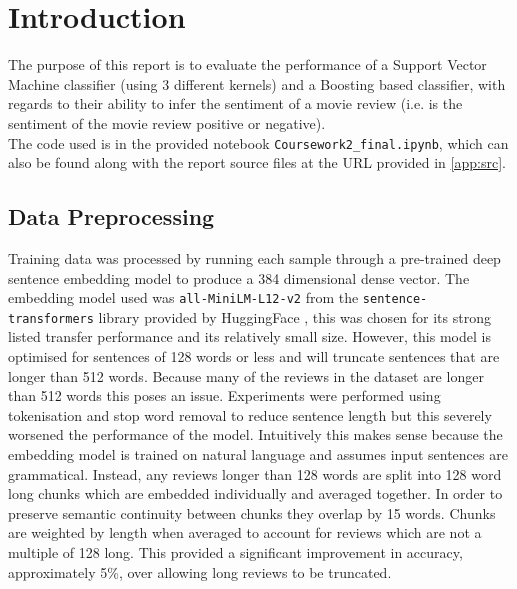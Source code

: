 \section{Introduction}

The purpose of this report is to evaluate the performance of a Support Vector Machine classifier (using 3 different kernels) and a Boosting based classifier, with regards to their ability to infer the sentiment of a movie review (i.e. is the sentiment of the movie review positive or negative).\\
The code used is in the provided notebook \verb|Coursework2_final.ipynb|, which can also be found along with the report source files at the URL provided in \autoref{app:src}.


\subsection{Data Preprocessing}
Training data was processed by running each sample through a pre-trained deep sentence embedding model to produce a 384 dimensional dense vector. The embedding model used was \verb|all-MiniLM-L12-v2| \cite{HuggingFace} from the \verb|sentence-transformers| library provided by HuggingFace , this was chosen for its strong listed transfer performance and its relatively small size. However, this model is optimised for sentences of 128 words or less and will truncate sentences that are longer than 512 words. Because many of the reviews in the dataset are longer than 512 words this poses an issue. Experiments were performed using tokenisation and stop word removal to reduce sentence length but this severely worsened the performance of the model. Intuitively this makes sense because the embedding model is trained on natural language and assumes input sentences are grammatical. Instead, any reviews longer than 128 words are split into 128 word long chunks which are embedded individually and averaged together. In order to preserve semantic continuity between chunks they overlap by 15 words. Chunks are weighted by length when averaged to account for reviews which are not a multiple of 128 long. This provided a significant improvement in accuracy, approximately 5\%,  over allowing long reviews to be truncated.


